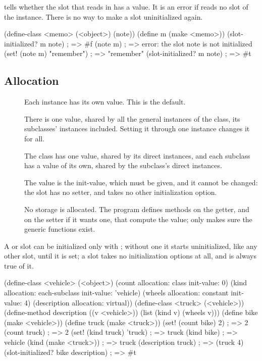  tells whether the
slot that  reads in  has a value. It is an error
if  reads no slot of the instance. There is no way to make a
slot uninitialized again.

\begin{dylan}
(define-class <memo> (<object>) (note))
(define m (make <memo>))
(slot-initialized? m note)     ; => #f
(note m)                       ; => error: the slot note is not initialized
(set! (note m) "remember")     ; => "remember"
(slot-initialized? m note)     ; => #t
\end{dylan}

\subsection{Allocation}\label{sec:classes-allocation}

\begin{description}
\item[] Each instance has its own value. This is the
  default.
\item[] There is one value, shared by all the general instances
  of the class, its subclasses' instances included. Setting it through one
  instance changes it for all.
\item[] The class has one value, shared by its direct
  instances, and each subclass has a value of its own, shared by the
  subclass's direct instances.
\item[] The value is the init-value, which must be given,
  and it cannot be changed: the slot has no setter, and takes no other
  initialization option.
\item[] No storage is allocated. The program defines methods
  on the getter, and on the setter if it wants one, that compute the value;
   only makes sure the generic functions exist.
\end{description}

\noindent A  or  slot can be initialized
only with ; without one it starts uninitialized, like
any other slot, until it is set; a  slot takes no initialization
options at all, and  is always true of it.

\begin{dylan}
(define-class <vehicle> (<object>)
  (count allocation: class init-value: 0)
  (kind allocation: each-subclass init-value: 'vehicle)
  (wheels allocation: constant init-value: 4)
  (description allocation: virtual))
(define-class <truck> (<vehicle>))
(define-method description ((v <vehicle>))
  (list (kind v) (wheels v)))
(define bike (make <vehicle>))
(define truck (make <truck>))
(set! (count bike) 2)          ; => 2
(count truck)                  ; => 2
(set! (kind truck) 'truck)     ; => truck
(kind bike)                    ; => vehicle
(kind (make <truck>))          ; => truck
(description truck)            ; => (truck 4)
(slot-initialized? bike description)   ; => #t
\end{dylan}

